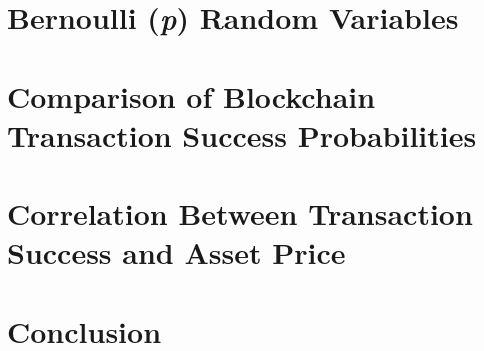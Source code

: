 \documentclass[12pt]{article}
\begin{document}
\section{Bernoulli (\emph{p}) Random Variables}

\section{Comparison of Blockchain Transaction Success Probabilities}

\section{Correlation Between Transaction Success and Asset Price}

\section{Conclusion}



\pagebreak
\end{document}
